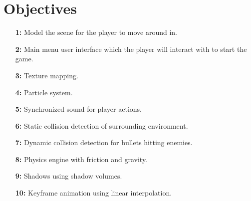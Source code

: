 \documentclass {article}
\begin{document}
\section{Objectives}
\begin{enumerate}
    \item[\textbf{1:}]
    Model the scene for the player to move around in.

    \item[\textbf{2:}]
    Main menu user interface which the player will interact with to start the game.

    \item[\textbf{3:}]
    Texture mapping.

    \item[\textbf{4:}]
    Particle system.

    \item[\textbf{5:}]
    Synchronized sound for player actions.

    \item[\textbf{6:}]
    Static collision detection of surrounding environment.

    \item[\textbf{7:}]
    Dynamic collision detection for bullets hitting enemies.

    \item[\textbf{8:}]
    Physics engine with friction and gravity.

    \item[\textbf{9:}]
    Shadows using shadow volumes. %

    \item[\textbf{10:}]
    Keyframe animation using linear interpolation.
\end{enumerate}
\end{document}
